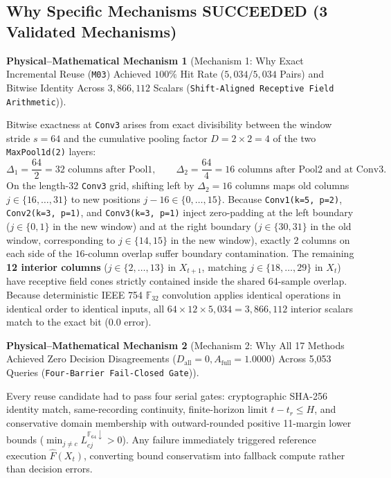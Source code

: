 \documentclass[11pt,a4paper]{article}
\newcommand{\F}{\mathbb{F}}
\newcommand{\code}[1]{{\small\ttfamily\nolinkurl{#1}}}
\newtheorem{mechanism}{Physical--Mathematical Mechanism}[section]
\begin{document}
\subsection{Why Specific Mechanisms SUCCEEDED (3 Validated Mechanisms)}

\begin{mechanism}[Mechanism 1: Why Exact Incremental Reuse (\code{M03}) Achieved $100\%$ Hit Rate ($5,034/5,034$ Pairs) and Bitwise Identity Across $3,866,112$ Scalars (\code{Shift-Aligned Receptive Field Arithmetic})]
\end{mechanism}
Bitwise exactness at \code{Conv3} arises from exact divisibility between the window stride $s = 64$ and the cumulative pooling factor $D = 2 \times 2 = 4$ of the two \code{MaxPool1d(2)} layers:
\begin{equation}
  \Delta_1 = \frac{64}{2} = 32 \text{ columns after Pool1}, \qquad \Delta_2 = \frac{64}{4} = 16 \text{ columns after Pool2 and at Conv3}.
\end{equation}
On the length-$32$ \code{Conv3} grid, shifting left by $\Delta_2 = 16$ columns maps old columns $j \in \{16,\dots,31\}$ to new positions $j - 16 \in \{0,\dots,15\}$. Because \code{Conv1(k=5, p=2)}, \code{Conv2(k=3, p=1)}, and \code{Conv3(k=3, p=1)} inject zero-padding at the left boundary ($j \in \{0, 1\}$ in the new window) and at the right boundary ($j \in \{30, 31\}$ in the old window, corresponding to $j \in \{14, 15\}$ in the new window), exactly $2$ columns on each side of the $16$-column overlap suffer boundary contamination. The remaining \textbf{12 interior columns} ($j \in \{2,\dots,13\}$ in $X_{t+1}$, matching $j \in \{18,\dots,29\}$ in $X_t$) have receptive field cones strictly contained inside the shared 64-sample overlap. Because deterministic IEEE 754 $\F_{32}$ convolution applies identical operations in identical order to identical inputs, all $64 \times 12 \times 5,034 = 3,866,112$ interior scalars match to the exact bit ($0.0$ error).

\begin{mechanism}[Mechanism 2: Why All 17 Methods Achieved Zero Decision Disagreements ($D_{\text{all}} = 0, A_{\text{full}} = 1.0000$) Across 5,053 Queries (\code{Four-Barrier Fail-Closed Gate})]
\end{mechanism}
Every reuse candidate had to pass four serial gates: cryptographic SHA-256 identity match, same-recording continuity, finite-horizon limit $t - t_r \le H$, and conservative domain membership with outward-rounded positive 11-margin lower bounds ($\min_{j \neq c} L_{cj}^{\F_{64}\downarrow} > 0$). Any failure immediately triggered reference execution $\widehat{F}(X_t)$, converting bound conservatism into fallback compute rather than decision errors.
\end{document}

